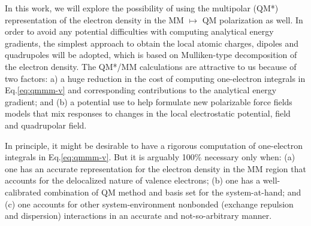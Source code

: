 \documentclass[aip,jcp,preprint,superscriptaddress,amsmath,amssymb]{revtex4-1}
\begin{document}
In this work, we will explore the possibility of using the multipolar (QM*) representation 
of the electron density in the MM $\mapsto$ QM polarization as well.  
In order to avoid any potential difficulties with computing analytical energy gradients, 
the simplest approach to obtain the local atomic charges, dipoles and quadrupoles 
will be adopted, which is based on Mulliken-type decomposition of the electron density.   
The QM*/MM calculations are attractive to us because of two factors: 
a) a huge reduction in the cost of computing one-electron integrals in Eq.\ref{eq:qmmm-v} 
and corresponding contributions to the analytical energy gradient; 
and (b) a potential use to help formulate new polarizable force fields models
that mix responses to changes in the local electrostatic potential, field and quadrupolar field.  

In principle, it might be desirable to have a rigorous computation of one-electron integrals in Eq.\ref{eq:qmmm-v}.  
But it is arguably 100\% necessary only when:
 (a) one has an accurate representation for the electron density in the MM region that accounts for the delocalized nature of valence electrons; 
 (b) one has a well-calibrated combination of QM method and basis set for the system-at-hand; and  
 (c) one accounts for other system-environment nonbonded (exchange repulsion and dispersion) interactions in an accurate and not-so-arbitrary manner. 


\end{document}
